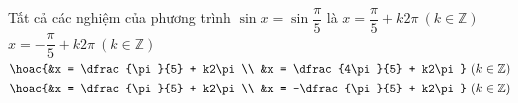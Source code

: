 \begin{ex}%
	Tất cả các nghiệm của phương trình $\sin x = \sin \dfrac{\pi}{5}$ là
	\choice
	{$x = \dfrac{\pi}{5} + k2\pi \ (k \in \mathbb{Z})$}
	{$x = -\dfrac{\pi}{5} + k2\pi \ (k \in \mathbb{Z})$}
	{\True $\hoac{&x = \dfrac{\pi}{5} + k2\pi \\ &x = \dfrac{4\pi}{5} + k2\pi} \ (k \in \mathbb{Z})$}
	{$\hoac{&x = \dfrac{\pi}{5} + k2\pi \\ &x = -\dfrac{\pi}{5} + k2\pi} \ (k \in \mathbb{Z})$}
\end{ex}


